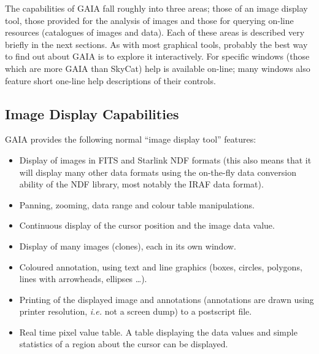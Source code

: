 \documentclass[twoside,11pt]{article}
\newcommand{\xref}[3]{#1}
\newcommand{\xlabel}[1]{}
\renewcommand{\_}{\texttt{\symbol{95}}}
\begin{document}
The capabilities of GAIA fall roughly into three areas; those of an
image display tool, those provided for the analysis of images and those
for querying on-line resources (catalogues of images and data). Each
of these areas is described very briefly in the next sections. As with
most graphical tools, probably the best way to find out about GAIA is
to explore it interactively. For specific windows (those which are
more GAIA than SkyCat) help is available on-line; many windows also
feature short one-line help descriptions of their controls.

\subsection{\xlabel{image_display_capabilities}Image Display Capabilities}
GAIA provides the following normal ``image display tool'' features:
\begin{itemize}
\item Display of images in FITS and Starlink \xref{NDF}{sun33}{}
  formats (this also means that it will display many other data formats
  using the on-the-fly data conversion ability of the NDF library, most
  notably the IRAF data format).

\item Panning, zooming, data range and colour table manipulations.

\item Continuous display of the cursor position and the image data
  value.

\item Display of many images (clones), each in its own window.

\item Coloured annotation, using text and line graphics (boxes,
  circles, polygons, lines with arrowheads, ellipses \ldots).

\item Printing of the displayed image and annotations (annotations
  are drawn using printer resolution, {\em i.e.} not a screen dump)
  to a postscript file.

\item Real time pixel value table. A table displaying the data
  values and simple statistics of a region about the cursor can be
  displayed.

\end{itemize}
\end{document}
